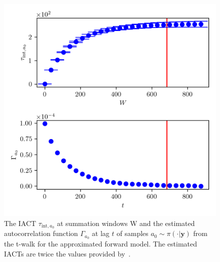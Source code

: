 \begin{figure}[ht!]
	\centering
	\includegraphics{UwerrTauIntTWalk9.png}
	\caption[IACT and autocorrelation function of samples $a_0 \sim \pi(\cdot|\bm{y})$, for approximated model.]{The IACT $\tau_{\text{int},a_0}$ at summation windows W and the estimated autocorrelation function $\Gamma_{a_0}$ at lag $t$ of samples $a_0 \sim \pi( \cdot| \bm{y})$ from the t-walk for the approximated forward model.
	The estimated IACTs are twice the values provided by~\cite{drikHesse, UwerrM}.}
\end{figure}

